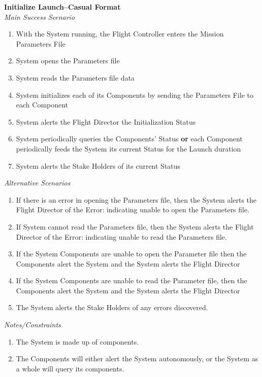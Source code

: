 \documentclass[letterpaper]{article}
\begin{document}
\noindent
\textbf{Initialize Launch--Casual Format}\\
\textit{Main Success Scenario}
\begin{enumerate}
   \item With the System running, the Flight Controller enters the
      Mission Parameters File
   \item System opens the Parameters file
   \item System reads the Parameters file data
   \item System initializes each of its Components by sending the
      Parameters File to each Component
   \item System alerts the Flight Director the Initialization Status
   \item System periodically queries the Components' Status 
      \textbf{or} each Component periodically feeds the System its
      current Status for the Launch duration
   \item System alerts the Stake Holders of its current Status
\end{enumerate}
\textit{Alternative Scenarios}
\begin{enumerate}
   \item[2a] If there is an error in opening the Parameters file,
      then the System alerts the Flight Director of the Error:
      indicating unable to open the Parameters file.
   \item[3a] If System cannot read the Parameters file, then the
      System alerts the Flight Director of the Error:  indicating
      unable to read the Parameters file.
   \item[4a] If the System Components are unable to open the Parameter
      file then the Components alert the System and the System
      alerts the Flight Director
   \item[4b] If the System Components are unable to read the
      Parameter file, then the Components alert the System and
      the System alerts the Flight Director
   \item[6a,7a] The System alerts the Stake Holders of any errors
      discovered.
\end{enumerate}
\textit{Notes/Constraints}
\begin{enumerate}
   \item[*a] The System is made up of components.
   \item[*b] The Components will either alert the System autonomously,
      or the System as a whole will query its components.
\end{enumerate}
\end{document}
